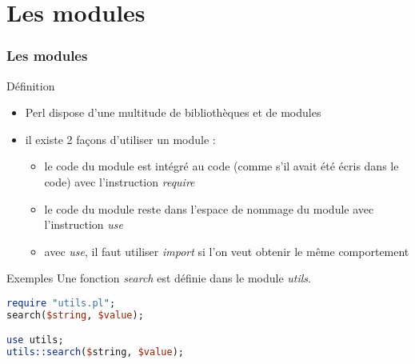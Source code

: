 \section{Les modules}

\begin{frame}[fragile]
  \frametitle{Les modules}

  \begin{block}{Définition}
    \begin{itemize}
    \item Perl dispose d'une multitude de bibliothèques et de modules
    \item il existe 2 façons d'utiliser un module :
      \begin{itemize}
      \item le code du module est intégré au code (comme s'il avait été écris
        dans le code) avec l'instruction \textit{require}
      \item le code du module reste dans l'espace de nommage du module avec
        l'instruction \textit{use}
      \item avec \textit{use}, il faut utiliser \textit{import} si l'on veut
        obtenir le même comportement
      \end{itemize}
    \end{itemize}
  \end{block}

  \begin{exampleblock}{Exemples}
    Une fonction \textit{search} est définie dans le module \textit{utils}.
    \begin{lstlisting}[language=perl]
require "utils.pl";
search($string, $value);

use utils;
utils::search($string, $value);
    \end{lstlisting}
  \end{exampleblock}

\end{frame}
